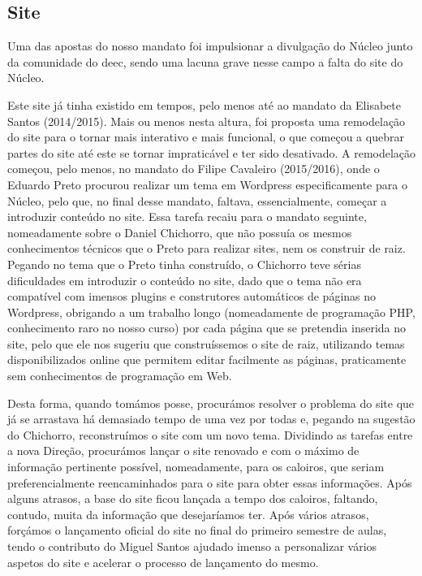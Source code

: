 
\subsection{Site}

Uma das apostas do nosso mandato foi impulsionar a divulgação do Núcleo junto da comunidade do \acrshort{deec}, sendo uma lacuna grave nesse campo a falta do site do Núcleo.

Este site já tinha existido em tempos, pelo menos até ao mandato da Elisabete Santos (2014/2015). Mais ou menos nesta altura, foi proposta uma remodelação do site para o tornar mais interativo e mais funcional, o que começou a quebrar partes do site até este se tornar impraticável e ter sido desativado. A remodelação começou, pelo menos, no mandato do Filipe Cavaleiro (2015/2016), onde o Eduardo Preto procurou realizar um tema em Wordpress especificamente para o Núcleo, pelo que, no final desse mandato, faltava, essencialmente, começar a introduzir conteúdo no site. Essa tarefa recaiu para o mandato seguinte, nomeadamente sobre o Daniel Chichorro, que não possuía os mesmos conhecimentos técnicos que o Preto para realizar sites, nem os construir de raiz. Pegando no tema que o Preto tinha construído, o Chichorro teve sérias dificuldades em introduzir o conteúdo no site, dado que o tema não era compatível com imensos plugins e construtores automáticos de páginas no Wordpress, obrigando a um trabalho longo (nomeadamente de programação PHP, conhecimento raro no nosso curso) por cada página que se pretendia inserida no site, pelo que ele nos sugeriu que construíssemos o site de raiz, utilizando temas disponibilizados online que permitem editar facilmente as páginas, praticamente sem conhecimentos de programação em Web.

Desta forma, quando tomámos posse, procurámos resolver o problema do site que já se arrastava há demasiado tempo de uma vez por todas e, pegando na sugestão do Chichorro, reconstruímos o site com um novo tema. Dividindo as tarefas entre a nova Direção, procurámos lançar o site renovado e com o máximo de informação pertinente possível, nomeadamente, para os caloiros, que seriam preferencialmente reencaminhados para o site para obter essas informações. Após alguns atrasos, a base do site ficou lançada a tempo dos caloiros, faltando, contudo, muita da informação que desejaríamos ter. Após vários atrasos, forçámos o lançamento oficial do site no final do primeiro semestre de aulas, tendo o contributo do Miguel Santos ajudado imenso a personalizar vários aspetos do site e acelerar o processo de lançamento do mesmo.

